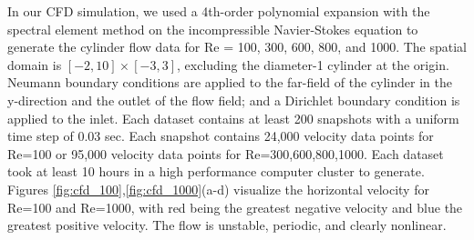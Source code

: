 In our CFD simulation, we used a 4th-order polynomial expansion with the spectral element method on the incompressible Navier-Stokes equation to generate the cylinder flow data for Re = 100, 300, 600, 800, and 1000. The spatial domain is $\left[-2,10\right]\times\left[-3,3\right]$, excluding the diameter-1 cylinder at the origin.  Neumann boundary conditions are applied to the far-field of the cylinder in the y-direction and the outlet of the flow field; and a Dirichlet boundary condition is applied to the inlet. Each dataset contains at least 200 snapshots with a uniform time step of 0.03 sec. Each snapshot contains 24,000 velocity data points for Re=100 or 95,000 velocity data points for Re=300,600,800,1000. Each dataset took at least 10 hours in a high performance computer cluster to generate. Figures \ref{fig:cfd_100},\ref{fig:cfd_1000}(a-d) visualize the horizontal velocity for Re=100 and Re=1000, with red being the greatest negative velocity and blue the greatest positive velocity. The flow is unstable, periodic, and clearly nonlinear.

\begin{figure*}[h] %
	\centering
	\\
	
	\caption{Visualization of Fluid Flow at Re = 100, CFD (a-d), E-GP (e-h)}
	\label{fig:cfd_100}
\end{figure*}

\begin{figure*}[h] %
	\centering
	\\
	\caption{Visualization of Fluid Flow at Re = 1000, CFD (a-d), E-GP (e-h)}
	\label{fig:cfd_1000}
\end{figure*}

